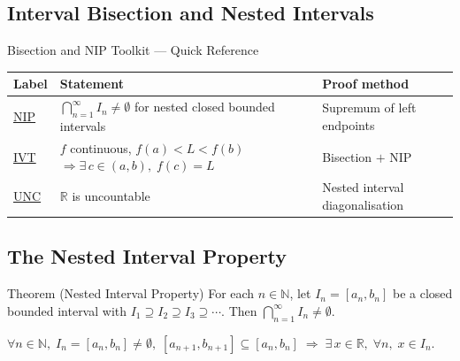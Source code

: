 
\subsection{Interval Bisection and Nested Intervals}
\label{sec:bisection-nested}

\begin{toolkitbox}{Bisection and NIP Toolkit --- Quick Reference}
\small
\begin{tabular}{l l l}
\toprule
\textbf{Label}  & \textbf{Statement}  & \textbf{Proof method} \\
\midrule
\hyperref[thm:nested-interval-property]{NIP}
   & $\bigcap_{n=1}^{\infty}I_n\neq\emptyset$ for nested closed bounded intervals
   & Supremum of left endpoints
  \\[4pt]
\hyperref[prop:ivt-bisection]{IVT}
   & $f$ continuous, $f(a)<L<f(b)$
    $\Rightarrow\exists\,c\in(a,b),\;f(c)=L$
   & Bisection $+$ NIP
  \\[4pt]
\hyperref[prop:r-uncountable]{UNC}
   & $\mathbb{R}$ is uncountable
   & Nested interval diagonalisation
  \\
\bottomrule
\end{tabular}
\end{toolkitbox}

\subsection*{The Nested Interval Property}
\label{subsec:nip}

\begin{theorembox}{Theorem (Nested Interval Property)}
\label{thm:nested-interval-property}
For each $n\in\mathbb{N}$, let $I_n=[a_n,b_n]$ be a closed bounded interval
with $I_1\supseteq I_2\supseteq I_3\supseteq\cdots$. Then
$\displaystyle\bigcap_{n=1}^{\infty}I_n\neq\emptyset$.
\end{theorembox}

\begin{remark}
$\forall n\in\mathbb{N},\;I_n=[a_n,b_n]\neq\emptyset,\;
[a_{n+1},b_{n+1}]\subseteq[a_n,b_n]
\;\Longrightarrow\;
\exists\,x\in\mathbb{R},\;\forall n,\;x\in I_n$.
\end{remark}

